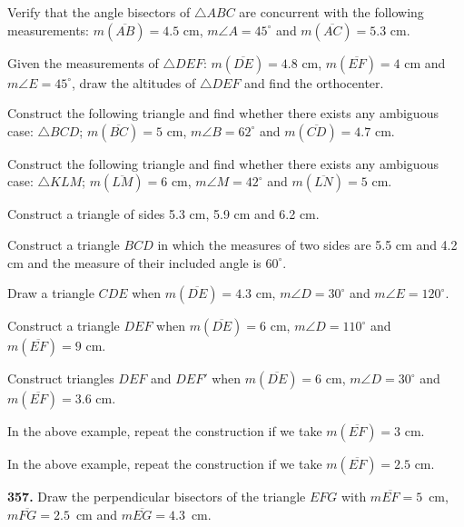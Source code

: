 \documentclass[11pt]{article}
\newcommand{\seg}[1]{\overline{#1}}
\begin{document}
\begin{wq}[start=287]
\item Verify that the angle bisectors of $\triangle ABC$ are concurrent with the following measurements: $m(\seg{AB})=4.5$ cm, $m\angle A=45^{\circ}$ and $m(\seg{AC})=5.3$ cm.

\item Given the measurements of $\triangle DEF$: $m(\seg{DE})=4.8$ cm, $m(\seg{EF})=4$ cm and $m\angle E=45^{\circ}$, draw the altitudes of $\triangle DEF$ and find the orthocenter.

\item Construct the following triangle and find whether there exists any ambiguous case: $\triangle BCD$; $m(\seg{BC})=5$ cm, $m\angle B=62^{\circ}$ and $m(\seg{CD})=4.7$ cm.

\item Construct the following triangle and find whether there exists any ambiguous case: $\triangle KLM$; $m(\seg{LM})=6$ cm, $m\angle M=42^{\circ}$ and $m(\seg{LN})=5$ cm.

\item Construct a triangle of sides 5.3 cm, 5.9 cm and 6.2 cm.

\item Construct a triangle $BCD$ in which the measures of two sides are 5.5 cm and 4.2 cm and the measure of their included angle is $60^{\circ}$.

\item Draw a triangle $CDE$ when $m(\seg{DE})=4.3$ cm, $m\angle D=30^{\circ}$ and $m\angle E=120^{\circ}$.

\item Construct a triangle $DEF$ when $m(\seg{DE})=6$ cm, $m\angle D=110^{\circ}$ and $m(\seg{EF})=9$ cm.

\item Construct triangles $DEF$ and $DEF'$ when $m(\seg{DE})=6$ cm, $m\angle D=30^{\circ}$ and $m(\seg{EF})=3.6$ cm.

\item In the above example, repeat the construction if we take $m(\seg{EF})=3$ cm.

\item In the above example, repeat the construction if we take $m(\seg{EF})=2.5$ cm.

\end{wq}



\noindent\textbf{357.} Draw the perpendicular bisectors of the triangle $EFG$ with $m\overline{EF}=5$~cm, $m\overline{FG}=2.5$~cm and $m\overline{EG}=4.3$~cm.
\end{document}
